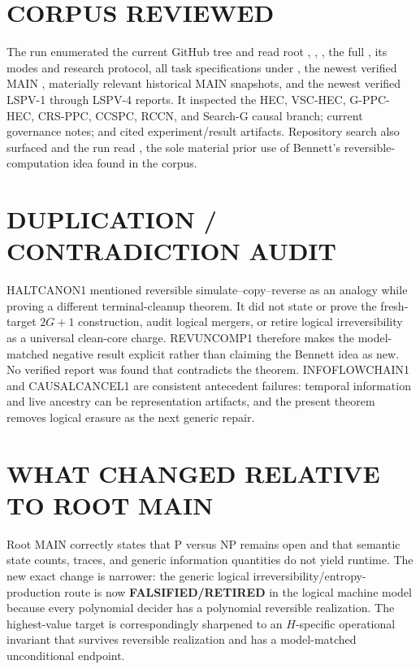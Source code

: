 \documentclass[11pt]{article}
\newcommand{\RETIRED}{\textbf{FALSIFIED/RETIRED}}
\begin{document}
\section{CORPUS REVIEWED}
The run enumerated the current GitHub tree and read root ,
, , the full
, its modes and research protocol,
all task specifications under , the newest verified MAIN
, materially relevant
historical MAIN snapshots, and the newest verified LSPV-1 through LSPV-4
reports.  It inspected the HEC, VSC-HEC, G-PPC-HEC, CRS-PPC, CCSPC, RCCN, and
Search-G causal branch; current governance notes; and cited experiment/result
artifacts.  Repository search also surfaced and the run read
, the sole
material prior use of Bennett's reversible-computation idea found in the
corpus.

\section{DUPLICATION / CONTRADICTION AUDIT}
HALTCANON1 mentioned reversible simulate--copy--reverse as an analogy while
proving a different terminal-cleanup theorem.  It did not state or prove the
fresh-target $2G+1$ construction, audit logical mergers, or retire logical
irreversibility as a universal clean-core charge.  REVUNCOMP1 therefore makes
the model-matched negative result explicit rather than claiming the Bennett
idea as new.  No verified report was found that contradicts the theorem.
INFOFLOWCHAIN1 and CAUSALCANCEL1 are consistent antecedent failures: temporal
information and live ancestry can be representation artifacts, and the
present theorem removes logical erasure as the next generic repair.

\section{WHAT CHANGED RELATIVE TO ROOT MAIN}
Root MAIN correctly states that P versus NP remains open and that semantic
state counts, traces, and generic information quantities do not yield
runtime.  The new exact change is narrower: the generic logical
irreversibility/entropy-production route is now \RETIRED{} in the logical
machine model because every polynomial decider has a polynomial reversible
realization.  The highest-value target is correspondingly sharpened to an
$H$-specific operational invariant that survives reversible realization and
has a model-matched unconditional endpoint.
\end{document}
